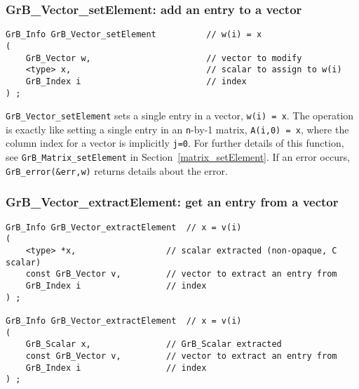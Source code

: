 \documentclass[12pt]{article}
\begin{document}
\subsubsection{{\sf GrB\_Vector\_setElement:}    add an entry to a vector}
\label{vector_setElement}

\begin{mdframed}[userdefinedwidth=6in]
{\footnotesize
\begin{verbatim}
GrB_Info GrB_Vector_setElement          // w(i) = x
(
    GrB_Vector w,                       // vector to modify
    <type> x,                           // scalar to assign to w(i)
    GrB_Index i                         // index
) ;
\end{verbatim} } \end{mdframed}

\verb'GrB_Vector_setElement' sets a single entry in a vector, \verb'w(i) = x'.
The operation is exactly like setting a single entry in an \verb'n'-by-1
matrix, \verb'A(i,0) = x', where the column index for a vector is implicitly
\verb'j=0'.  For further details of this function, see
\verb'GrB_Matrix_setElement' in Section~\ref{matrix_setElement}.
If an error occurs, \verb'GrB_error(&err,w)' returns details about the error.

\subsubsection{{\sf GrB\_Vector\_extractElement:} get an entry from a vector}
\label{vector_extractElement}

\begin{mdframed}[userdefinedwidth=6in]
{\footnotesize
\begin{verbatim}
GrB_Info GrB_Vector_extractElement  // x = v(i)
(
    <type> *x,                  // scalar extracted (non-opaque, C scalar)
    const GrB_Vector v,         // vector to extract an entry from
    GrB_Index i                 // index
) ;

GrB_Info GrB_Vector_extractElement  // x = v(i)
(
    GrB_Scalar x,               // GrB_Scalar extracted
    const GrB_Vector v,         // vector to extract an entry from
    GrB_Index i                 // index
) ;
\end{verbatim} } \end{mdframed}
\end{document}
